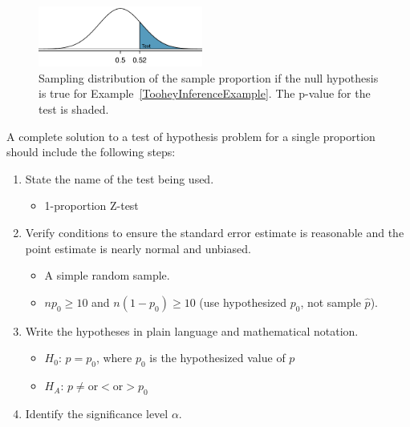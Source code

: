 \begin{figure}[h]
\centering
\includegraphics[width=0.48\textwidth]{ch_inference_for_props/figures/pValueForCampaignManagerClaimOfMoreThan50PercentSupport/pValueForCampaignManagerClaimOfMoreThan50PercentSupport}
\caption{Sampling distribution of the sample proportion if the null hypothesis is true for Example~\ref{TooheyInferenceExample}. The p-value for the test is shaded.}
\label{pValueForCampaignManagerClaimOfMoreThan50PercentSupport}
\end{figure}

\begin{termBox}{
A complete solution to a test of hypothesis problem for a single proportion should include the following steps:
\begin{enumerate}
\setlength{\itemsep}{0mm}
\item State the name of the test being used.
\begin{itemize}
\setlength{\itemsep}{0mm}
\item 1-proportion Z-test
\end{itemize}
\item Verify conditions to ensure the standard error estimate is reasonable and the point estimate is nearly normal and unbiased.\vspace{-1.5mm}
  \begin{itemize}
  \setlength{\itemsep}{0mm}
  \item A simple random sample.
  \item $np_0\geq10$ and $n(1-p_0)\geq10$ (use hypothesized $p_0$, not sample $\hat{p}$).
  \end{itemize}
\item Write the hypotheses in plain language and mathematical notation.\vspace{-1.5mm}
  \begin{itemize}
  \setlength{\itemsep}{0mm}
  \item $H_0$: $p = p_0$, where $p_0$ is the hypothesized value of $p$
  \item $H_A$: $p \ne \text{or} < \text{or} > p_0$
  \end{itemize}
\item Identify the significance level $\alpha$.

\end{enumerate}}
\end{termBox}
